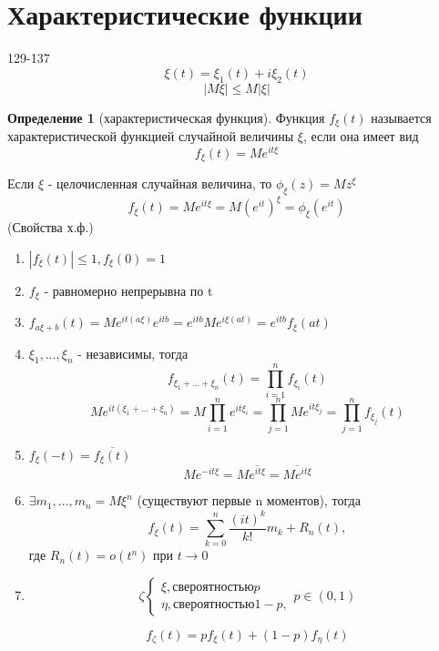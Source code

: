\documentclass[a4paper]{article}
\theoremstyle{definition}
\newtheorem*{definition}{Определение}
\theoremstyle{remark}
\begin{document}
\section{Характеристические функции}
129-137 
\[\xi(t) = \xi_1(t)+ i\xi_2(t)\]
\[|M\xi| \le M |\xi|\]
\begin{definition}[характеристическая функция]
    Функция $f_\xi(t)$ называется характеристической функцией случайной величины $\xi$, если она имеет вид
    \[f_\xi(t)  = Me^{it\xi}\]
\end{definition}
Если $\xi$ - целочисленная случайная величина, то $\phi_\xi (z) = M z^\xi$
\[f_\xi (t) = M e^{it\xi} = M (e^{it})^\xi = \phi_\xi (e^{it})\]
(Свойства х.ф.)
\begin{enumerate}
    \item $|f_\xi(t)|\le 1, f_\xi(0) = 1$
    \item $f_\xi$ - равномерно непрерывна по t
    \item $f_{a\xi+ b}(t) = M e^{it(a\xi)}e^{itb} = e^{itb} M e^{i\xi(at)} = e^{itb} f_\xi(at)$
    \item $\xi_1, \dots, \xi_n$ - независимы, тогда
    \[f_{\xi_1+ \dots+ \xi_n}(t) = \prod_{i = 1}^n f_{\xi_i}(t)\]
    \[M e^{it (\xi_1+ \dots+ \xi_n)} = M \prod_{i = 1}^{n} e^{it \xi_i} = \prod_{j = 1}^{n} M e^{it \xi_j} = \prod_{j = 1}^n f_{\xi_j} (t)\]
    \item $f_\xi(-t) = \overline{f_\xi(t) }$
    \[M e^{-it\xi} = M \overline{ e^{it\xi}} = \overline{M e^{it\xi}}\]
    \item $\exists m_1, \dots, m_n = M \xi^n$ (существуют первые n моментов), тогда 
    \[f_\xi(t) = \sum_{k = 0}^{n}\frac{(it)^k}{k!}m_k + R_n(t),\]
    где $R_n(t) = o(t^n)$ при $t \to 0$
    \item \[\zeta  \begin{cases}
        \xi, с вероятностью p \\
        \eta, с вероятностью 1 - p,
        \end{cases}
        p \in (0, 1)\]
        
        \[f_\zeta (t)  = p f_\xi (t) + (1 - p) f_\eta(t)\]
\end{enumerate}
\end{document}

